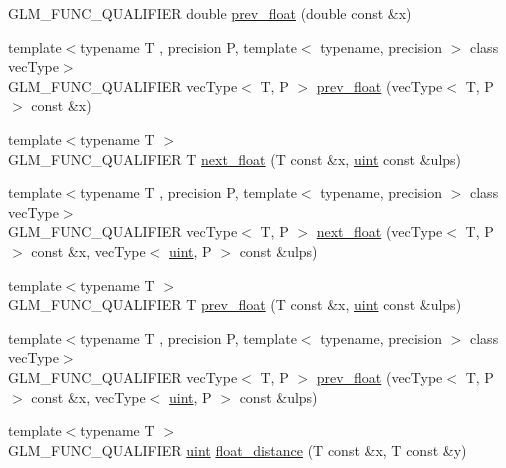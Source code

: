 \begin{DoxyCompactItemize}
\item 
G\+L\+M\+\_\+\+F\+U\+N\+C\+\_\+\+Q\+U\+A\+L\+I\+F\+I\+E\+R double \hyperlink{namespaceglm_a82cdd5674b80569f118b33a6a327c9bd}{prev\+\_\+float} (double const \&x)
\item 
{\footnotesize template$<$typename T , precision P, template$<$ typename, precision $>$ class vec\+Type$>$ }\\G\+L\+M\+\_\+\+F\+U\+N\+C\+\_\+\+Q\+U\+A\+L\+I\+F\+I\+E\+R vec\+Type$<$ T, P $>$ \hyperlink{namespaceglm_a90916626e6b0ed925938226f31b38c6b}{prev\+\_\+float} (vec\+Type$<$ T, P $>$ const \&x)
\item 
{\footnotesize template$<$typename T $>$ }\\G\+L\+M\+\_\+\+F\+U\+N\+C\+\_\+\+Q\+U\+A\+L\+I\+F\+I\+E\+R T \hyperlink{namespaceglm_ae4ffae05b7502be722f522c04f7e42ac}{next\+\_\+float} (T const \&x, \hyperlink{stb__image_8c_a91ad9478d81a7aaf2593e8d9c3d06a14}{uint} const \&ulps)
\item 
{\footnotesize template$<$typename T , precision P, template$<$ typename, precision $>$ class vec\+Type$>$ }\\G\+L\+M\+\_\+\+F\+U\+N\+C\+\_\+\+Q\+U\+A\+L\+I\+F\+I\+E\+R vec\+Type$<$ T, P $>$ \hyperlink{namespaceglm_a3ad10c60be0fa0e754c8064ca13c4b91}{next\+\_\+float} (vec\+Type$<$ T, P $>$ const \&x, vec\+Type$<$ \hyperlink{stb__image_8c_a91ad9478d81a7aaf2593e8d9c3d06a14}{uint}, P $>$ const \&ulps)
\item 
{\footnotesize template$<$typename T $>$ }\\G\+L\+M\+\_\+\+F\+U\+N\+C\+\_\+\+Q\+U\+A\+L\+I\+F\+I\+E\+R T \hyperlink{namespaceglm_a87ac8f75510274e112fe8512cfaa6935}{prev\+\_\+float} (T const \&x, \hyperlink{stb__image_8c_a91ad9478d81a7aaf2593e8d9c3d06a14}{uint} const \&ulps)
\item 
{\footnotesize template$<$typename T , precision P, template$<$ typename, precision $>$ class vec\+Type$>$ }\\G\+L\+M\+\_\+\+F\+U\+N\+C\+\_\+\+Q\+U\+A\+L\+I\+F\+I\+E\+R vec\+Type$<$ T, P $>$ \hyperlink{namespaceglm_a742d4d85c23906178d1fd0c9fbab266c}{prev\+\_\+float} (vec\+Type$<$ T, P $>$ const \&x, vec\+Type$<$ \hyperlink{stb__image_8c_a91ad9478d81a7aaf2593e8d9c3d06a14}{uint}, P $>$ const \&ulps)
\item 
{\footnotesize template$<$typename T $>$ }\\G\+L\+M\+\_\+\+F\+U\+N\+C\+\_\+\+Q\+U\+A\+L\+I\+F\+I\+E\+R \hyperlink{stb__image_8c_a91ad9478d81a7aaf2593e8d9c3d06a14}{uint} \hyperlink{group__gtc__ulp_ga2e09bd6c8b0a9c91f6f5683d68245634}{float\+\_\+distance} (T const \&x, T const \&y)

\end{DoxyCompactItemize}
